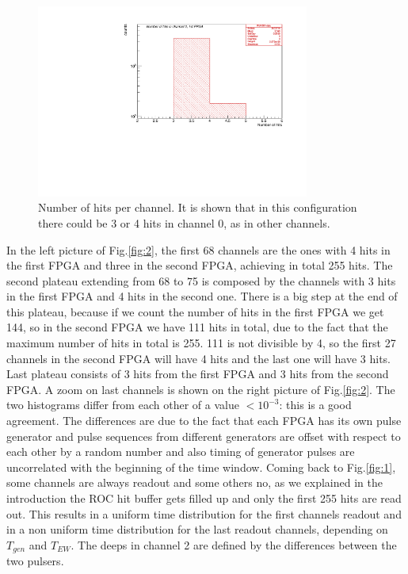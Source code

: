 \begin{figure}[H]
\centering
\includegraphics[width =0.8\textwidth]{figures/pdf/figure_00066_nhits_ch00_run281.pdf}
\caption{Number of hits per channel. It is shown that in this configuration there could be 3 or 4 hits in channel 0, as in other channels.}
\label{fig:66}
\end{figure}

In the left picture of Fig.\ref{fig:2}, the first 68 channels are the ones with 4 hits in the first FPGA and three in the second FPGA, achieving in total 255 hits. The second plateau extending from 68 to 75 is composed by the channels with 3 hits in the first FPGA and 4 hits in the second one. There is a big step at the end of this plateau, because if we count the number of hits in the first FPGA we get 144, so in the second FPGA we have 111 hits in total, due to the fact that the maximum number of hits in total is 255. 111 is not divisible by 4, so the first 27 channels in the second FPGA will have 4 hits and the last one will have 3 hits. Last plateau consists of 3 hits from the first FPGA and 3 hits from the second FPGA. A zoom on last channels is shown on the right picture of Fig.\ref{fig:2}. The two histograms differ from each other of a value $<10^{-3}$: this is a good agreement. The differences are due to the fact that each FPGA has its own pulse generator and pulse sequences from different generators are offset with respect to each other by a random number and also timing of generator pulses are uncorrelated with the beginning of the time window. Coming back to Fig.\ref{fig:1}, some channels are always readout and some others no, as we explained in the introduction the ROC hit buffer gets filled up and only the first 255 hits are read out. This results in a uniform time distribution for the first channels readout and in a non uniform time distribution for the last readout channels, depending on $T_{gen}$ and $T_{EW}$. The deeps in channel 2 are defined by the differences between the two pulsers. 


